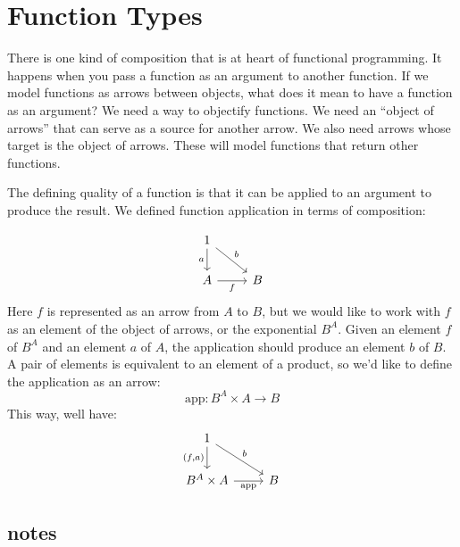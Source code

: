 \documentclass[DaoFP]{subfiles}
\begin{document}
\setcounter{chapter}{5}

\chapter{Function Types}

There is one kind of composition that is at heart of functional programming. It happens when you pass a function as an argument to another function. If we model functions as arrows between objects, what does it mean to have a function as an argument? We need a way to objectify functions. We need an ``object of arrows'' that can serve as a source for another arrow. We also need arrows whose target is the object of arrows. These will model functions that return other functions.

The defining quality of a function is that it can be applied to an argument to produce the result. We defined function application in terms of composition:

\[
 \begin{tikzcd}
 1
 \arrow[d, "a"']
 \arrow[rd, "b"]
 \\
 A
 \arrow[r, "f"']
& B
 \end{tikzcd}
\]
Here $f$ is represented as an arrow from $A$ to $B$, but we would like to work with $f$ as an element of the object of arrows, or the exponential $B^A$. Given an element $f$ of $B^A$ and an element $a$ of $A$, the application should produce an element $b$ of $B$. A pair of elements is equivalent to an element of a product, so we'd like to define the application as an arrow:
\[\text{app} \colon B^A \times A \to B\]
This way, well have:
\[
 \begin{tikzcd}
 1
 \arrow[d, "{(f, a)}"']
 \arrow[rd, "b"]
 \\
 B^A \times A
 \arrow[r, "\text{app}"']
& B
 \end{tikzcd}
\]



\section{notes}



\begin{exercise}
\end{exercise}
\begin{haskell}
\end{haskell}
\end{document}

